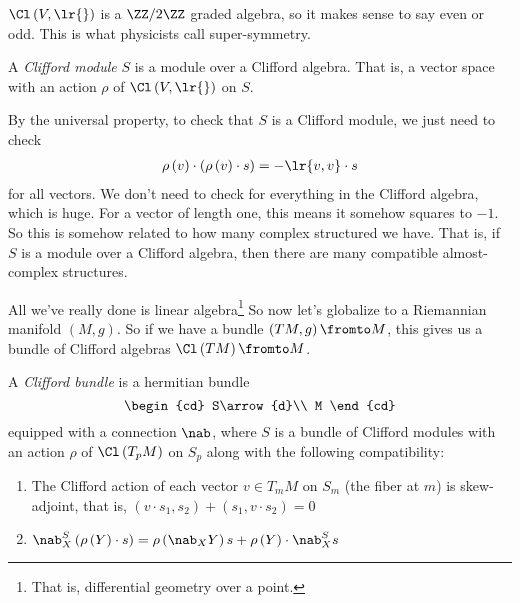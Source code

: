 \documentclass{amsart}
\begin{document}
\begin{rmk}
$\Cl\left( V , \lr{} \right)$ is a $\ZZ / 2\ZZ$ graded algebra, so it makes
sense to say even or odd.
This is what physicists call super-symmetry.
\end{rmk}

\begin{defn}
A \emph{Clifford module} $S$ is a module over a
Clifford algebra.
That is, a vector space with an action $\rho$ of $\Cl\left( V , \lr{} \right)$ on $S$.
\end{defn}

\begin{rmk}
By the universal property, to check that $S$ is a Clifford module, we just need to check 
\begin{align}
\rho\left( v \right)\cdot \left( \rho\left( v \right) \cdot s \right) = -\lr{v,v}\cdot s
\end{align}
for all vectors. We don't need to check for everything in the Clifford algebra, which is huge.
For a vector of length one, this means it somehow squares to $-1$. 
So this is somehow related to how many complex structured we have. 
That is, if $S$ is a module over a Clifford algebra, then there are many compatible
almost-complex structures.
\end{rmk}

All we've really done is linear algebra\footnote{
That is, differential geometry over a point.}
So now let's globalize to a Riemannian manifold $\left( M , g \right)$.
So if we have a bundle $\left( TM , g \right) \fromto M$, 
this gives us a bundle of Clifford algebras
$\Cl\left( TM \right) \fromto M$.

\begin{defn}
A \emph{Clifford bundle} is a hermitian bundle
\begin{equation}
\begin{cd}
S\arrow{d}\\
M
\end{cd}
\end{equation}
equipped with a connection $\nab$, where $S$ is a bundle of Clifford modules with 
an action $\rho$ of $\Cl\left( T_pM \right)$ on $S_p$ along with the following compatibility:
\begin{enumerate}
\item The Clifford action of each vector $v\in T_mM$ on $S_m$ (the fiber at $m$) is
skew-adjoint, that is, 
$\left( v\cdot s_1 , s_2 \right) +
\left( s_1 , v\cdot s_2 \right) = 0$
\item $\nab_X^S \left( \rho\left( Y \right) \cdot s \right)
= \rho\left( \nab_X Y \right)s + \rho\left( Y \right) \cdot \nab_X^S s$
\end{enumerate}
\end{defn}
\end{document}
